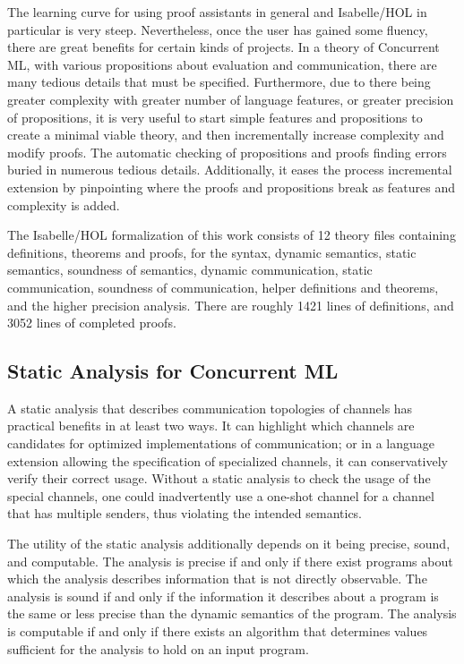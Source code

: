 \documentclass[letterpaper, 11pt]{extarticle}
\begin{document}
The learning curve for using proof assistants in general and Isabelle/HOL in particular is very steep.
Nevertheless, once the user has gained some fluency, there are great benefits for certain kinds of projects.  
In a theory of Concurrent ML, with various propositions about evaluation and communication, there are many
tedious details that must be specified. Furthermore, due to there being greater complexity with greater
number of language features, or greater precision of propositions, it is very useful to start simple features
and propositions to create a minimal viable theory, and then incrementally increase complexity and modify proofs.
The automatic checking of propositions and proofs finding errors buried in numerous tedious details.
Additionally, it eases the process incremental extension by pinpointing where the proofs and propositions break
as features and complexity is added.

The Isabelle/HOL formalization of this work consists of 12 theory files containing definitions, theorems
and proofs, for the syntax, dynamic semantics, static semantics, soundness of semantics, dynamic communication,
static communication, soundness of communication, helper definitions and theorems, and the
higher precision analysis.  There are roughly 1421 lines of definitions, and 3052 lines of completed proofs. 

\subsection{Static Analysis for Concurrent ML}
A static analysis that describes communication
topologies of channels has practical benefits in at least two ways.  It can highlight which
channels are candidates for optimized implementations of communication; or in a language
extension allowing the specification of specialized channels, it can conservatively verify
their correct usage. Without a static analysis to check the usage of the special channels, one
could inadvertently use a one-shot channel for a channel that has multiple senders, thus
violating the intended semantics. 

The utility of the static analysis additionally depends on it being precise, sound, and
computable. The analysis is precise if and only if there exist programs about which the analysis
describes information that is not directly observable. The analysis is sound if and only if the
information it describes about a program is the same or less precise than the dynamic
semantics of the program. The analysis is computable if and only if there exists an algorithm that
determines values sufficient for the analysis to hold on an input program.
\end{document}
